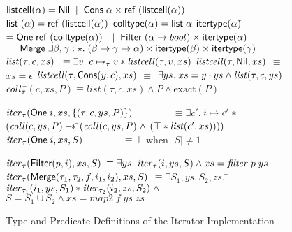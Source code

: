 \begin{figure}
\mbox{}
\begin{specification}
$\mathsf{listcell}(\alpha) = \mathsf{Nil} \;\;|\;\; \mathsf{Cons}\; \alpha \times \mathsf{ref}\;(\mathsf{listcell}(\alpha))$ \\
\> $\mathsf{list}\;{(}\alpha) = \mathsf{ref}\;(\mathsf{listcell}{(\alpha)})$
\nextline
$\mathsf{colltype}(\alpha) = \mathsf{list}\;{\alpha}$ 
$\mathsf{itertype}{(\alpha)} $\=$=  \mathsf{One}\;\mathsf{ref}\;(\mathsf{colltype}{(\alpha)})$ \nextline
                       \>$ \;\;|\;\; 
                          \mathsf{Filter}\;(\alpha \to bool) \times \mathsf{itertype}{(\alpha)}$ \nextline
                       \>$\;\;|\;\; \mathsf{Merge}\; \exists \beta, \gamma:\star.\; (\beta \to \gamma \to \alpha) \times \mathsf{itertype}(\beta) \times \mathsf{itertype}(\gamma)$
$\mathit{list}(\tau, c, xs)$ \qquad\qquad\qquad\= $\equiv \exists v.\; c \mapsto_\tau v * \mathit{listcell}(\tau, v, xs)$ 
\nextline
$\mathit{listcell}(\tau, \mathsf{Nil}, xs)$ \> $\equiv$ \= $xs = \epsilon$ 
\nextline
$\mathit{listcell}(\tau, \mathsf{Cons}(y,c), xs)$ \> $\equiv$ \> 
   $\exists ys.\; xs = y\cdot ys \land \mathit{list}(\tau, c, ys)$ 
$\mathit{coll}_\tau$\=$(c, xs, P) \equiv list(\tau, c, xs) \land P \land \mbox{exact}(P)$ 

$\mathit{iter}_\tau(\mathsf{One}\;i, xs, \{{(\tau, c, ys, P)}\}) \qquad\qquad$\=$\equiv \exists c'.\;$\=$i \mapsto c' \;*$ \nextline
                                                                   \>                      \>$(\mathit{coll}(c, ys, P) -\!\!*\, $\=$(\mathit{coll}(c, ys, P) \;\land $\nextline
                                                                   \>                      \>                             \>$(\top * \mathit{list}(c', xs))))$ 
\nextline
$\mathit{iter}_\tau(\mathsf{One}\;i, xs, S) \qquad\qquad$\>$\equiv \bot$ when $|S| \not= 1$
\nextline

$\mathit{iter}_\tau(\mathsf{Filter}(p, i), xs, S)$ \>$\equiv 
  \exists ys.\; \mathit{iter}_\tau(i, ys, S) \land xs = \mathit{filter}\;p\;ys$ 
\nextline
$\mathit{iter}_{\tau}(\mathsf{Merge}(\tau_1, \tau_2, f, i_1, i_2), xs, S)$ \>$\equiv 
  \exists S_1, ys, S_2, zs.$ 
\nextline
  \> \qquad \= $\mathit{iter}_{\tau_1}(i_1, ys, S_1) * \mathit{iter}_{\tau_2}(i_2, zs, S_2) \;\land$
\nextline \> \>$S = S_1 \cup S_2 \land xs = \mathit{map2}\;f\;ys\;zs$ 
\end{specification}
\caption{Type and Predicate Definitions of the Iterator Implementation}
\label{iterator-pred-impl}
\end{figure}

